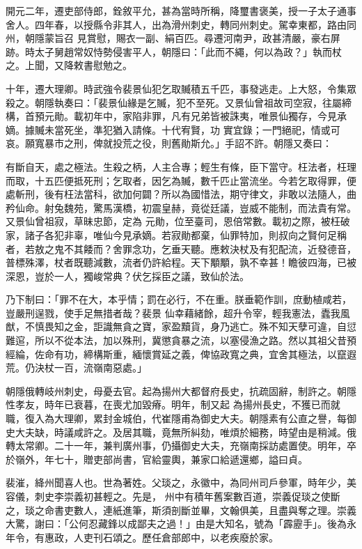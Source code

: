 \begin{pinyinscope}
 開元二年，遷吏部侍郎，銓敘平允，甚為當時所稱，降璽書褒美，授一子太子通事舍人。四年春，以授縣令非其人，出為滑州刺史，轉同州刺史。駕幸東都，路由同州，朝隱蒙旨召
 見賞慰，賜衣一副、絹百匹。尋遷河南尹，政甚清嚴，豪右屏跡。時太子舅趙常奴恃勢侵害平人，朝隱曰：「此而不繩，何以為政？」執而杖之。上聞，又降敕書慰勉之。



 十年，遷大理卿。時武強令裴景仙犯乞取贓積五千匹，事發逃走。上大怒，令集眾殺之。朝隱執奏曰：「裴景仙緣是乞贓，犯不至死。又景仙曾祖故司空寂，往屬締構，首預元勛。載初年中，家陷非罪，凡有兄弟皆被誅夷，唯景仙獨存，今見承嫡。據贓未當死坐，準犯猶入請條。十代宥賢，功
 實宜錄；一門絕祀，情或可哀。願寬暴市之刑，俾就投荒之役，則舊勛斯允。」手詔不許。朝隱又奏曰：



 有斷自天，處之極法。生殺之柄，人主合專；輕生有條，臣下當守。枉法者，枉理而取，十五匹便抵死刑；乞取者，因乞為贓，數千匹止當流坐。今若乞取得罪，便處斬刑，後有枉法當科，欲加何闢？所以為國惜法，期守律文，非敢以法隨人，曲矜仙命。射兔魏苑，驚馬漢橋，初震皇赫，竟從廷議，豈威不能制，而法貴有常。又景仙曾祖寂，草昧忠節，定為
 元勛，位至臺司，恩倍常數。載初之際，被枉破家，諸子各犯非辜，唯仙今見承嫡。若寂勛都棄，仙罪特加，則叔向之賢何足稱者，若敖之鬼不其餧而？舍罪念功，乞垂天聽。應敕決杖及有犯配流，近發德音，普標殊澤，杖者既聽減數，流者仍許給程。天下顒顒，孰不幸甚！瞻彼四海，已被深恩，豈於一人，獨峻常典？伏乞採臣之議，致仙於法。



 乃下制曰：「罪不在大，本乎情；罰在必行，不在重。朕垂範作訓，庶動植咸若，豈嚴刑逞戮，使手足無措者哉？裴景
 仙幸藉緒餘，超升令宰，輕我憲法，蠹我風猷，不慎畏知之金，詎識無貪之寶，家盈黷貨，身乃逃亡。殊不知天孽可違，自愆難逭，所以不從本法，加以殊刑，冀懲貪暴之流，以塞侵漁之路。然以其祖父昔預經綸，佐命有功，締構斯重，緬懷賞延之義，俾協政寬之典，宜舍其極法，以竄遐荒。仍決杖一百，流嶺南惡處。」



 朝隱俄轉岐州刺史，母憂去官。起為揚州大都督府長史，抗疏固辭，制許之。朝隱性孝友，時年已衰暮，在喪尤加毀瘠。明年，制又起
 為揚州長史，不獲已而就職，復入為大理卿，累封金城伯，代崔隱甫為御史大夫。朝隱素有公直之譽，每御史大夫缺，時議咸許之。及居其職，竟無所糾劾，唯煩於細務，時望由是稍減。俄轉太常卿。二十一年，兼判廣州事，仍攝御史大夫，充嶺南採訪處置使。明年，卒於嶺外，年七十，贈吏部尚書，官給靈輿，兼家口給遞還鄉，謚曰貞。



 裴漼，絳州聞喜人也。世為著姓。父琰之，永徽中，為同州司戶參軍，時年少，美容儀，刺史李崇義初甚輕之。先是，
 州中有積年舊案數百道，崇義促琰之使斷之，琰之命書吏數人，連紙進筆，斯須剖斷並畢，文翰俱美，且盡與奪之理。崇義大驚，謝曰：「公何忍藏鋒以成鄙夫之過！」由是大知名，號為「霹靂手」。後為永年令，有惠政，人吏刊石頌之。歷任倉部郎中，以老疾廢於家。




\end{pinyinscope}
